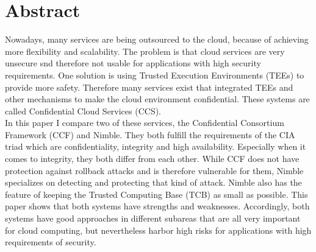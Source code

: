 \section*{Abstract}	
 Nowadays, many services are being outsourced to the cloud, because of achieving more flexibility and scalability. The problem is that cloud services are very unsecure snd therefore not usable for applications with high security requirements. One solution is using Trusted Execution Environments (TEEs) to provide more safety. Therefore many services exist that integrated TEEs and other mechanisms to make the cloud environment confidential. These systems are called Confidential Cloud Services (CCS).\\
  In this paper I compare two of these services, the Confidential Consortium Framework (CCF) and Nimble. They both fulfill the requirements of the CIA triad which are confidentiality, integrity and high availability. Especially when it comes to integrity, they both differ from each other. While CCF does not have protection against rollback attacks and is therefore vulnerable for them, Nimble specializes on detecting and protecting that kind of attack. Nimble also has the feature of keeping the Trusted Computing Base (TCB) as small as possible. This paper shows that both systems have strengths and weaknesses. %
  Accordingly, both systems have good approaches in different subareas that are all very important for cloud computing, but nevertheless harbor high risks for applications with high requirements of security.\\